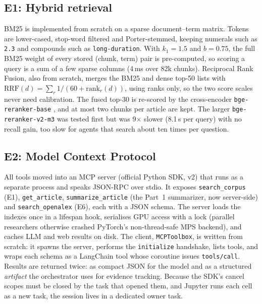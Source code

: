 \documentclass[conference]{IEEEtran}
\begin{document}
\subsection{E1: Hybrid retrieval}
BM25 is implemented from scratch on a sparse document--term matrix. Tokens are lower-cased, stop-word
filtered and Porter-stemmed, keeping numerals such as \texttt{2.3} and compounds such as
\texttt{long-duration}. With $k_1{=}1.5$ and $b{=}0.75$, the full BM25 weight of every stored
(chunk, term) pair is pre-computed, so scoring a query is a sum of a few sparse columns (4\,ms over 82k
chunks). Reciprocal Rank Fusion, also from scratch, merges the BM25 and dense top-50 lists with
$\mathrm{RRF}(d)=\sum_r 1/(60+\mathrm{rank}_r(d))$, using ranks only, so the two score scales never
need calibration. The fused top-30 is re-scored by the cross-encoder \texttt{bge-reranker-base}
\cite{nogueira2019passage}, and at most two chunks per article are kept. The larger
\texttt{bge-reranker-v2-m3} was tested first but was 9$\times$ slower (8.1\,s per query) with no recall
gain, too slow for agents that search about ten times per question.

\subsection{E2: Model Context Protocol}
All tools moved into an MCP server (official Python SDK, v2) that runs as a separate process and speaks
JSON-RPC over stdio. It exposes \texttt{search\_corpus} (E1), \texttt{get\_article},
\texttt{summarize\_article} (the Part~1 summarizer, now server-side) and \texttt{search\_openalex} (E6),
each with a JSON schema. The server loads the indexes once in a lifespan hook, serialises GPU access with a
lock (parallel researchers otherwise crashed PyTorch's non-thread-safe MPS backend), and caches LLM and
web results on disk. The client, \texttt{MCPToolbox}, is written from scratch: it spawns the server,
performs the \texttt{initialize} handshake, lists tools, and wraps each schema as a LangChain tool whose
coroutine issues \texttt{tools/call}. Results are returned twice: as compact JSON for the model and as a
structured \emph{artifact} the orchestrator uses for evidence tracking. Because the SDK's cancel scopes must
be closed by the task that opened them, and Jupyter runs each cell as a new task, the session lives in a
dedicated owner task.
\end{document}
